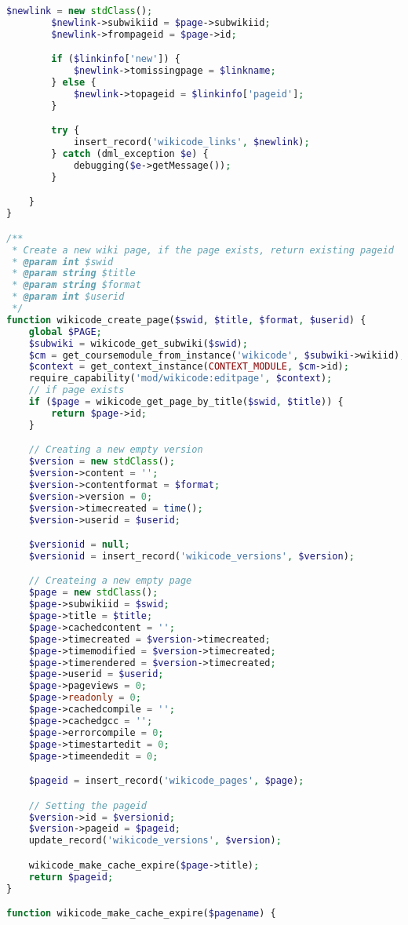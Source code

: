 \begin{lstlisting}[language=PHP]
        $newlink = new stdClass();
        $newlink->subwikiid = $page->subwikiid;
        $newlink->frompageid = $page->id;

        if ($linkinfo['new']) {
            $newlink->tomissingpage = $linkname;
        } else {
            $newlink->topageid = $linkinfo['pageid'];
        }

        try {
            insert_record('wikicode_links', $newlink);
        } catch (dml_exception $e) {
            debugging($e->getMessage());
        }

    }
}

/**
 * Create a new wiki page, if the page exists, return existing pageid
 * @param int $swid
 * @param string $title
 * @param string $format
 * @param int $userid
 */
function wikicode_create_page($swid, $title, $format, $userid) {
    global $PAGE;
    $subwiki = wikicode_get_subwiki($swid);
    $cm = get_coursemodule_from_instance('wikicode', $subwiki->wikiid);
    $context = get_context_instance(CONTEXT_MODULE, $cm->id);
    require_capability('mod/wikicode:editpage', $context);
    // if page exists
    if ($page = wikicode_get_page_by_title($swid, $title)) {
        return $page->id;
    }

    // Creating a new empty version
    $version = new stdClass();
    $version->content = '';
    $version->contentformat = $format;
    $version->version = 0;
    $version->timecreated = time();
    $version->userid = $userid;

    $versionid = null;
    $versionid = insert_record('wikicode_versions', $version);

    // Createing a new empty page
    $page = new stdClass();
    $page->subwikiid = $swid;
    $page->title = $title;
    $page->cachedcontent = '';
    $page->timecreated = $version->timecreated;
    $page->timemodified = $version->timecreated;
    $page->timerendered = $version->timecreated;
    $page->userid = $userid;
    $page->pageviews = 0;
    $page->readonly = 0;
	$page->cachedcompile = '';
	$page->cachedgcc = '';
	$page->errorcompile = 0;
	$page->timestartedit = 0;
	$page->timeendedit = 0;

    $pageid = insert_record('wikicode_pages', $page);

    // Setting the pageid
    $version->id = $versionid;
    $version->pageid = $pageid;
    update_record('wikicode_versions', $version);

    wikicode_make_cache_expire($page->title);
    return $pageid;
}

function wikicode_make_cache_expire($pagename) {
	

\end{lstlisting}
